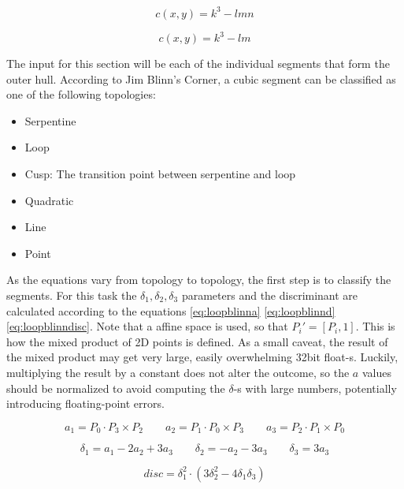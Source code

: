 \documentclass[\topdir/main.tex]{subfiles}
\begin{document}
\begin{equation} \label{eq:bezier_blinnloop3}
    c(x, y) = k^3 - lmn
\end{equation}

\begin{equation} \label{eq:bezier_blinnloop3_2}
    c(x, y) = k^3 - lm
\end{equation}



The input for this section will be each of the individual segments that form the outer hull. According to Jim Blinn's Corner\cite{blinn2002}, a cubic segment can be classified as one of the following topologies:

\begin{itemize}
    \item Serpentine
    \item Loop
    \item Cusp: The transition point between serpentine and loop
    \item Quadratic
    \item Line
    \item Point
\end{itemize}

As the equations vary from topology to topology, the first step is to classify the segments. For this task the $\delta_1, \delta_2, \delta_3$ parameters and the discriminant are calculated according to the equations \eqref{eq:loopblinna} \eqref{eq:loopblinnd} \eqref{eq:loopblinndisc}. Note that a affine space is used, so that $P_i' = [P_i, 1]$. This is how the mixed product of 2D points is defined. As a small caveat, the result of the mixed product may get very large, easily overwhelming 32bit float-s. Luckily, multiplying the result by a constant does not alter the outcome, so the $a$ values should be normalized to avoid computing the $\delta$-s with large numbers, potentially introducing floating-point errors.

\begin{equation} \label{eq:loopblinna}
    a_1 = P_0 \cdot P_3 \times P_2 \qquad
    a_2 = P_1 \cdot P_0 \times P_3 \qquad
    a_3 = P_2 \cdot P_1 \times P_0
\end{equation}

\begin{equation} \label{eq:loopblinnd}
    \delta_1 = a_1 - 2a_2 + 3a_3 \qquad
    \delta_2 = -a_2 - 3a_3 \qquad
    \delta_3 = 3a_3
\end{equation}

\begin{equation} \label{eq:loopblinndisc}
    disc = \delta_1^2 \cdot (3\delta_2^2 - 4\delta_1\delta_3)
\end{equation}
\end{document}

